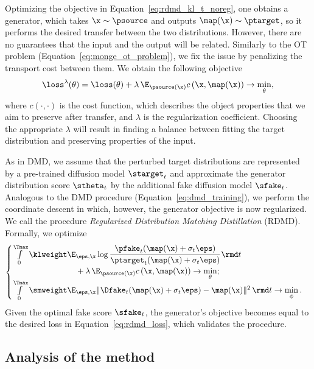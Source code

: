 Optimizing the objective in Equation~\ref{eq:rdmd_kl_t_noreg}, one obtains a generator, which takes $\x \sim\psource$ and outputs $\map(\x) \sim \ptarget$, so it performs the desired transfer between the two distributions. However, there are no guarantees that the input and the output will be related. Similarly to the OT problem (Equation~\ref{eq:monge_ot_problem}), we fix the issue by penalizing the transport cost between them. We obtain the following objective
\begin{equation}
\label{eq:rdmd_loss}
\loss^\lambda(\theta) = \loss(\theta) + \lambda\,\E_{\psource(\x)} c\left(\x, \map(\x)\right) \rightarrow\min\limits_{\theta},
\end{equation}
where $c(\cdot, \cdot)$ is the cost function, which describes the object properties that we aim to preserve after transfer,  and $\lambda$ is the regularization coefficient. Choosing the appropriate $\lambda$ will result in finding a balance between fitting the target distribution and preserving properties of the input.

As in DMD, we assume that the perturbed target distributions are  represented by a pre-trained diffusion model $\starget_t$ and approximate the generator distribution score $\stheta_t$ by the additional fake diffusion model $\sfake_t$. Analogous to the DMD procedure (Equation~\ref{eq:dmd_training}), we perform the coordinate descent in which, however, the generator objective is now regularized. We call the procedure \emph{Regularized Distribution Matching Distillation} (RDMD). Formally, we optimize
\begin{align}
\label{eq:rdmd_training}
\begin{cases}
    \int\limits_{0}^{\Tmax} \klweight \E_{\eps, \x} \log \cfrac{\pfake_t(\map(\x) + \sigma_t \eps)}{\ptarget_t(\map(\x) + \sigma_t \eps)} \, \rmd t \\
    \:\:\:\:\:\:\:\:\:\:\:\:\:\:\:\:\:\:\:\:\:\:\:\:\:\:\:\:\:\:\:\:\:\:\:\:+\:\lambda \, \E_{\psource(\x)} c\left(\x, \map(\x)\right) \rightarrow \min\limits_{\theta}; \\
    \int\limits_{0}^{\Tmax} \smweight \E_{\eps, \x} \| \Dfake_t(\map(\x) + \sigma_t \eps) - \map(\x) \|^2 \,\rmd t \rightarrow \min\limits_{\phi}.
\end{cases}
\end{align}
Given the optimal fake score $\sfake_t$, the generator's objective becomes equal to the desired loss in Equation~\ref{eq:rdmd_loss}, which validates the procedure.
\subsection{Analysis of the method}
\label{subseq:analysis}

